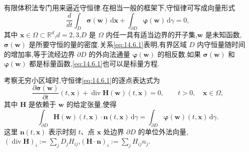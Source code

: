 有限体积法专门用来逼近守恒律.在相当一般的框架下,守恒律可写成向量形式
\begin{equation}\label{eq:14.6.1}
  \frac{d}{dt}\int_D\boldsymbol{\sigma}(\boldsymbol{w})\,\mathrm d\boldsymbol{x}
      +\int_{\partial D}\boldsymbol{\varphi}(\boldsymbol{w})\,\mathrm d\gamma=0,
\end{equation}
其中 \(\boldsymbol{x}\in\Omega\subset\mathbb R^d\),\(d=2,3\),\(D\) 是 \(\Omega\) 内任一具有适当边界的开子集,\(\boldsymbol{w}\) 是未知函数,\(\boldsymbol{\sigma}(\boldsymbol{w})\) 是所要守恒的量的密度.关系\eqref{eq:14.6.1}表明,有界区域 \(D\) 内守恒量随时间的增加率,等于流经边界 \(\partial D\) 的外向法通量 \(\boldsymbol{\varphi}(\boldsymbol{w})\) 的相反数.如果 \(\boldsymbol{\sigma}(\boldsymbol{w})\) 和 \(\boldsymbol{\varphi}(\boldsymbol{w})\) 都是标量函数,\eqref{eq:14.6.1}也可以是标量方程.

考察无穷小区域时,守恒律\eqref{eq:14.6.1}的逐点表达式为
\begin{equation}\label{eq:14.6.2}
  \frac{\partial\boldsymbol{\sigma}(\boldsymbol{w})}{\partial t}(t,\boldsymbol{x})
     +\operatorname{div}\boldsymbol{H}(\boldsymbol{w})(t,\boldsymbol{x})=0,
        \qquad t>0,\quad\boldsymbol{x}\in\Omega,
\end{equation}
其中 \(\boldsymbol{H}\) 是依赖于 \(\boldsymbol{w}\) 的给定张量,使得
\[
  \int_{\partial D}\boldsymbol{H}(\boldsymbol{w})(t,\boldsymbol{x})\cdot\boldsymbol{n}(t,\boldsymbol{x})\,\mathrm d\gamma
     =\int_{\partial D}\boldsymbol{\varphi}(\boldsymbol{w})(t,\boldsymbol{x})\,\mathrm d\gamma.
\]
这里 \(\boldsymbol{n}(t,\boldsymbol{x})\) 表示时刻 \(t\)、点 \(\boldsymbol{x}\) 处边界 \(\partial D\) 的单位外法向量,\((\operatorname{div}\boldsymbol{H})_i:=\sum_jD_jH_{ij}\),\((\boldsymbol{H}\cdot\boldsymbol{n})_i:=\sum_jH_{ij}n_j\).

